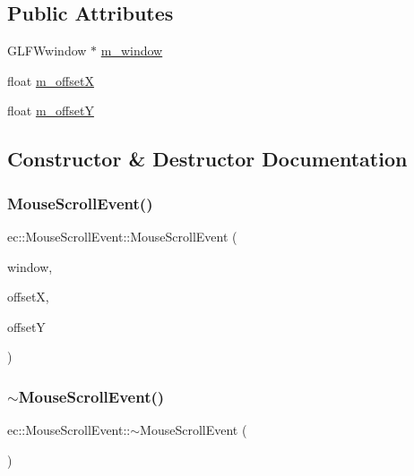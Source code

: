 \subsection*{Public Attributes}
\begin{DoxyCompactItemize}
\item 
G\+L\+F\+Wwindow $\ast$ \mbox{\hyperlink{structec_1_1_mouse_scroll_event_a76f795ff6bd0629d496005b8e415552a}{m\+\_\+window}}
\item 
float \mbox{\hyperlink{structec_1_1_mouse_scroll_event_a1925678027669178fcdd37bb3f3c034d}{m\+\_\+offsetX}}
\item 
float \mbox{\hyperlink{structec_1_1_mouse_scroll_event_ac366f5d0fb127838cca2387b7af61524}{m\+\_\+offsetY}}
\end{DoxyCompactItemize}


\subsection{Constructor \& Destructor Documentation}
\mbox{\label{structec_1_1_mouse_scroll_event_a3bccf854cfd63d44a49db296fc88b8dd}} 
\subsubsection{\texorpdfstring{Mouse\+Scroll\+Event()}{MouseScrollEvent()}}
{\footnotesize\ttfamily ec\+::\+Mouse\+Scroll\+Event\+::\+Mouse\+Scroll\+Event (\begin{DoxyParamCaption}\item[{G\+L\+F\+Wwindow $\ast$}]{window,  }\item[{const float}]{offsetX,  }\item[{const float}]{offsetY }\end{DoxyParamCaption})}

\mbox{\label{structec_1_1_mouse_scroll_event_a253aa9552ed33bc767b64057c0d4a457}} 
\subsubsection{\texorpdfstring{$\sim$\+Mouse\+Scroll\+Event()}{~MouseScrollEvent()}}
{\footnotesize\ttfamily ec\+::\+Mouse\+Scroll\+Event\+::$\sim$\+Mouse\+Scroll\+Event (\begin{DoxyParamCaption}{ }\end{DoxyParamCaption})}



